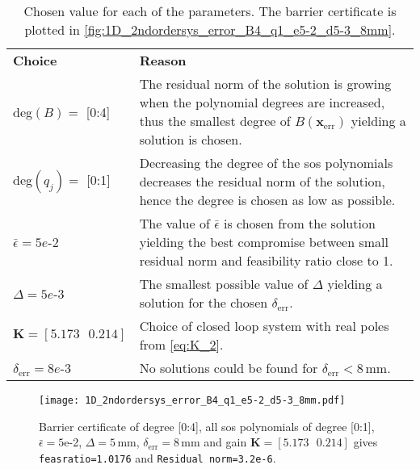 \begin{table}[htbp]
	\begin{tabularx}{\textwidth}{l X}
		\rowcolor{HeaderBlue}
		\textbf{Choice} & \textbf{Reason}\\
		deg$(B)=$ [0:4] & %
		The residual norm of the solution is growing when the polynomial degrees are increased, thus the smallest degree of $B(\mathbf{x}_\text{err})$ yielding a solution is chosen. 
		\\
		\rowcolor{textBlue}
		deg$(q_j)=$ [0:1] & Decreasing the degree of the \gls{sos} polynomials decreases the residual norm of the solution, hence the degree is chosen as low as possible.\\
		$\bar{\epsilon}=5e$-2 & The value of $\bar{\epsilon}$ is chosen from the solution yielding the best compromise between small residual norm and feasibility ratio close to 1. \\
		\rowcolor{textBlue}
		$\Delta=5e$-3 & The smallest possible value of $\Delta$ yielding a solution for the chosen $\delta_\text{err}$.\\
		$\textbf{K}=[5.173  \,\,\,\,  0.214]$ & Choice of closed loop system with real poles from \autoref{eq:K_2}.\\
		\rowcolor{textBlue}
		$\delta_\text{err}=8e$-3 & No solutions could be found for $\delta_\text{err}<8$\,mm.
	\end{tabularx}
	\caption{Chosen value for each of the parameters. The barrier certificate is plotted in \autoref{fig:1D_2ndordersys_error_B4_q1_e5-2_d5-3_8mm}.}
	\label{tab:sostools_choice_error2}
\end{table}

\begin{figure}[H]
	\centering
	\texttt{[image: 1D\_2ndordersys\_error\_B4\_q1\_e5-2\_d5-3\_8mm.pdf]}
	\caption{Barrier certificate of degree [0:4], all \gls{sos} polynomials of degree [0:1], $\bar{\epsilon}=5$e-2, $\Delta=5$\,mm, $\delta_\text{err}=8$\,mm and gain $\textbf{K}=[5.173  \,\,\,\,  0.214]$ gives \texttt{feasratio=1.0176} and \texttt{Residual norm=3.2e-6}.}
	\label{fig:1D_2ndordersys_error_B4_q1_e5-2_d5-3_8mm}
\end{figure}

